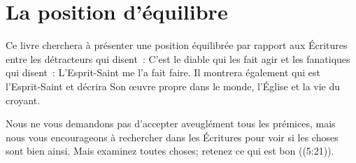 \section{La position d'\'equilibre}

Ce livre cherchera à présenter une position équilibrée par rapport aux Écritures
 entre les détracteurs qui disent~: \og C'est le diable qui les fait agir \fg{}
 et les fanatiques qui disent~: \og L'Esprit-Saint me l'a fait faire. \fg{}
 Il montrera également qui est l'Esprit-Saint et décrira Son œuvre propre dans
 le monde, l'Église et la vie du croyant.

Nous ne vous demandons pas d'accepter aveuglément tous les prémices, mais nous
 vous encourageons à rechercher dans les Écritures pour voir si les choses sont
 bien ainsi. \og Mais examinez toutes choses; retenez ce qui est bon \fg{}
 ((5:21)).
\thispagestyle{chapterend}

